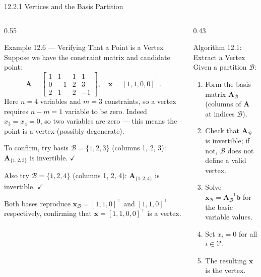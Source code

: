 \documentclass[aspectratio=169,10pt]{beamer}
\newcommand{\xv}{\mathbf{x}}
\newcommand{\bv}{\mathbf{b}}
\newcommand{\Av}{\mathbf{A}}
\newcommand{\calB}{\mathcal{B}}
\newcommand{\calV}{\mathcal{V}}
\begin{document}
\begin{frame}[allowframebreaks]{12.2.1 Vertices and the Basis Partition}
\framebreak

\begin{columns}
  \begin{column}{0.55\textwidth}
    \begin{exampleblock}{Example 12.6 --- Verifying That a Point is a Vertex}
      Suppose we have the constraint matrix and candidate point:
      \[
        \Av = \begin{bmatrix}1&1&1&1\\0&-1&2&3\\2&1&2&-1\end{bmatrix},\quad
        \xv = [1,1,0,0]^\top.
      \]
      Here $n = 4$ variables and $m = 3$ constraints, so a vertex requires
      $n - m = 1$ variable to be zero.  Indeed $x_3 = x_4 = 0$, so two variables
      are zero --- this means the point is a vertex (possibly degenerate).

      To confirm, try basis $\calB = \{1,2,3\}$ (columns 1, 2, 3):
      $\Av_{\{1,2,3\}}$ is invertible. $\checkmark$

      Also try $\calB = \{1,2,4\}$ (columns 1, 2, 4):
      $\Av_{\{1,2,4\}}$ is invertible. $\checkmark$

      Both bases reproduce $\xv_\calB = [1,1,0]^\top$ and $[1,1,0]^\top$
      respectively, confirming that $\xv = [1,1,0,0]^\top$ is a vertex.
    \end{exampleblock}
  \end{column}
  \begin{column}{0.43\textwidth}
    \begin{block}{Algorithm 12.1: Extract a Vertex}
      Given a partition $\calB$:
      \begin{enumerate}
        \item Form the basis matrix $\Av_\calB$ (columns of $\Av$ at indices $\calB$).
        \item Check that $\Av_\calB$ is invertible; if not, $\calB$ does not define a
              valid vertex.
        \item Solve $\xv_\calB = \Av_\calB^{-1}\bv$ for the basic variable values.
        \item Set $x_i = 0$ for all $i \in \calV$.
        \item The resulting $\xv$ is the vertex.
      \end{enumerate}
    \end{block}
  \end{column}
\end{columns}

\end{frame}
\end{document}
